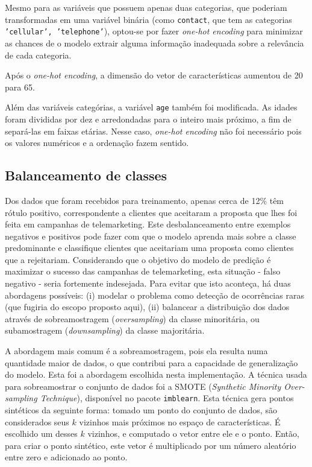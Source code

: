 \documentclass[12pt]{article}
\begin{document}
Mesmo para as variáveis que possuem apenas duas categorias, que poderiam transformadas em uma variável binária (como \texttt{contact}, que tem as categorias \texttt{'cellular', 'telephone'}), optou-se por fazer \emph{one-hot encoding} para minimizar as chances de o modelo extrair alguma informação inadequada sobre a relevância de cada categoria.

Após o \emph{one-hot encoding}, a dimensão do vetor de características aumentou de 20 para 65.

Além das variáveis categórias, a variável \texttt{age} também foi modificada. As idades foram divididas por dez e arredondadas para o inteiro mais próximo, a fim de separá-las em faixas etárias. Nesse caso, \emph{one-hot encoding} não foi necessário pois os valores numéricos e a ordenação fazem sentido.

\subsection{Balanceamento de classes}

Dos dados que foram recebidos para treinamento, apenas cerca de 12\% têm rótulo positivo, correspondente a clientes que aceitaram a proposta que lhes foi feita em campanhas de telemarketing. Este desbalanceamento entre exemplos negativos e positivos pode fazer com que o modelo aprenda mais sobre a classe predominante e classifique clientes que aceitariam uma proposta como clientes que a rejeitariam. Considerando que o objetivo do modelo de predição é maximizar o sucesso das campanhas de telemarketing, esta situação - falso negativo - seria fortemente indesejada. Para evitar que isto aconteça, há duas abordagens possíveis: (i) modelar o problema como detecção de ocorrências raras (que fugiria do escopo proposto aqui), (ii) balancear a distribuição dos dados através de sobreamostragem (\emph{oversampling}) da classe minoritária, ou subamostragem (\emph{downsampling}) da classe majoritária.

A abordagem mais comum é a sobreamostragem, pois ela resulta numa quantidade maior de dados, o que contribui para a capacidade de generalização do modelo. Esta foi a abordagem escolhida nesta implementação. A técnica usada para sobreamostrar o conjunto de dados foi a SMOTE (\emph{Synthetic Minority Over-sampling Technique}), disponível no pacote \texttt{imblearn}. Esta técnica gera pontos sintéticos da seguinte forma: tomado um ponto do conjunto de dados, são considerados seus $k$ vizinhos mais próximos no espaço de características. É escolhido um desses $k$ vizinhos, e computado o vetor entre ele e o ponto. Então, para criar o ponto sintético, este vetor é multiplicado por um número aleatório entre zero e adicionado ao ponto.
\end{document}
